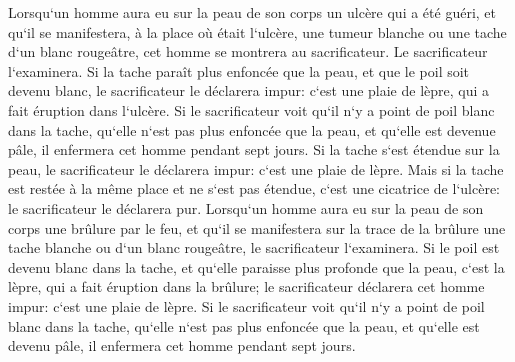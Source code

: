 \verse Lorsqu`un homme aura eu sur la peau de son corps un ulcère qui a été guéri, 
\verse et qu`il se manifestera, à la place où était l`ulcère, une tumeur blanche ou une tache d`un blanc rougeâtre, cet homme se montrera au sacrificateur. 
\verse Le sacrificateur l`examinera. Si la tache paraît plus enfoncée que la peau, et que le poil soit devenu blanc, le sacrificateur le déclarera impur: c`est une plaie de lèpre, qui a fait éruption dans l`ulcère. 
\verse Si le sacrificateur voit qu`il n`y a point de poil blanc dans la tache, qu`elle n`est pas plus enfoncée que la peau, et qu`elle est devenue pâle, il enfermera cet homme pendant sept jours. 
\verse Si la tache s`est étendue sur la peau, le sacrificateur le déclarera impur: c`est une plaie de lèpre. 
\verse Mais si la tache est restée à la même place et ne s`est pas étendue, c`est une cicatrice de l`ulcère: le sacrificateur le déclarera pur. 
\verse Lorsqu`un homme aura eu sur la peau de son corps une brûlure par le feu, et qu`il se manifestera sur la trace de la brûlure une tache blanche ou d`un blanc rougeâtre, le sacrificateur l`examinera. 
\verse Si le poil est devenu blanc dans la tache, et qu`elle paraisse plus profonde que la peau, c`est la lèpre, qui a fait éruption dans la brûlure; le sacrificateur déclarera cet homme impur: c`est une plaie de lèpre. 
\verse Si le sacrificateur voit qu`il n`y a point de poil blanc dans la tache, qu`elle n`est pas plus enfoncée que la peau, et qu`elle est devenu pâle, il enfermera cet homme pendant sept jours. 

